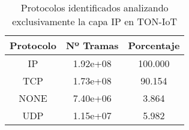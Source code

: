 \begin{table}[H]
    \begin{center}
        \begin{tabular}{|c | c c|} 
            \hline
            \textbf{Protocolo} & \textbf{Nº Tramas} & \textbf{Porcentaje}\\
            \hline\hline
IP & 1.92e+08 & 100.000 \\
TCP & 1.73e+08 & 90.154 \\
NONE & 7.40e+06 & 3.864 \\
UDP & 1.15e+07 & 5.982 \\
            \hline
        \end{tabular}
    \end{center}
    \caption{Protocolos identificados analizando exclusivamente la capa IP en TON-IoT}
    \label{table:toniotprotocolsip}
\end{table}
